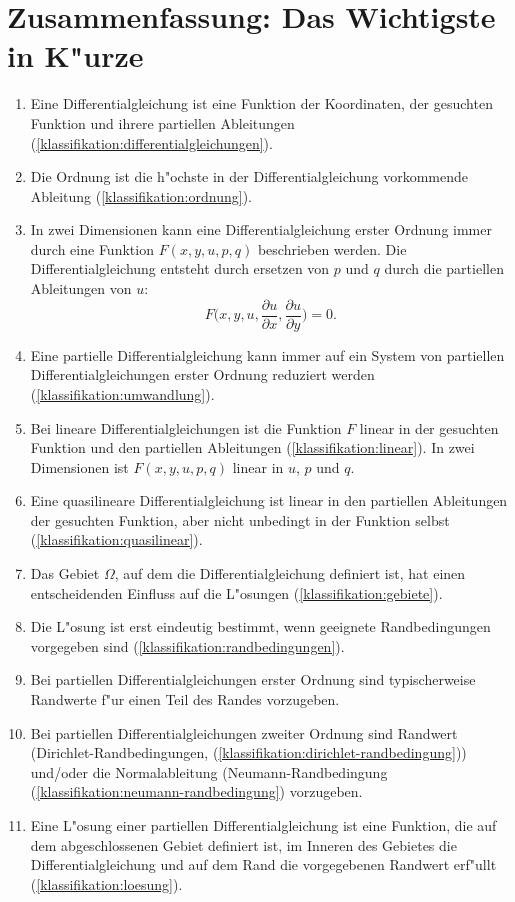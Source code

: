 \section{Zusammenfassung: Das Wichtigste in K"urze}
\begin{enumerate}
\item Eine Differentialgleichung ist eine Funktion
der Koordinaten, der gesuchten Funktion und ihrere partiellen Ableitungen
(\ref{klassifikation:differentialgleichungen}).
\item Die Ordnung ist die h"ochste in der Differentialgleichung vorkommende
Ableitung (\ref{klassifikation:ordnung}).
\item In zwei Dimensionen kann eine Differentialgleichung erster Ordnung
immer durch eine Funktion $F(x,y,u,p,q)$ beschrieben werden. Die
Differentialgleichung entsteht durch ersetzen von $p$ und $q$ durch
die partiellen Ableitungen von $u$:
\[
F\biggl(
x,y, u,
\frac{\partial u}{\partial x},
\frac{\partial u}{\partial y}
\biggr)=0.
\]
\item Eine partielle Differentialgleichung kann immer auf ein System
von partiellen Differentialgleichungen erster Ordnung reduziert werden
(\ref{klassifikation:umwandlung}).
\item Bei lineare Differentialgleichungen ist die Funktion $F$ linear
in der gesuchten Funktion und den partiellen Ableitungen
(\ref{klassifikation:linear}). In zwei
Dimensionen ist $F(x,y,u,p,q)$ linear in $u$, $p$ und $q$.
\item Eine quasilineare Differentialgleichung ist linear in den
partiellen Ableitungen der gesuchten Funktion, aber nicht unbedingt
in der Funktion selbst (\ref{klassifikation:quasilinear}).
\item Das Gebiet $\Omega$, auf dem die Differentialgleichung definiert
ist, hat einen entscheidenden Einfluss auf die L"osungen (\ref{klassifikation:gebiete}).
\item Die L"osung ist erst eindeutig bestimmt, wenn geeignete Randbedingungen
vorgegeben sind (\ref{klassifikation:randbedingungen}). 
\item Bei partiellen Differentialgleichungen erster Ordnung sind typischerweise
Randwerte f"ur einen Teil des Randes vorzugeben.
\item Bei partiellen Differentialgleichungen zweiter Ordnung sind
Randwert (Dirichlet-Rand\-bedingungen,
(\ref{klassifikation:dirichlet-randbedingung}))
und/oder die Normalableitung
(Neumann-Randbedingung (\ref{klassifikation:neumann-randbedingung})
vorzugeben.
\item Eine L"osung einer partiellen Differentialgleichung ist eine
Funktion, die auf dem abgeschlossenen Gebiet definiert ist, im Inneren
des Gebietes die Differentialgleichung und auf dem Rand
die vorgegebenen Randwert erf"ullt (\ref{klassifikation:loesung}).

\end{enumerate}

